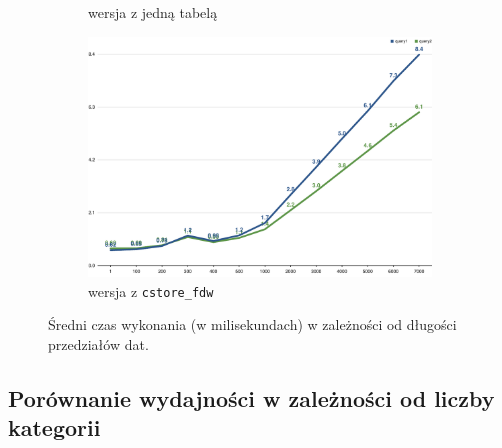 \documentclass[a4paper,11pt]{article}
\begin{document}
\begin{figure}[h!]
\begin{subfigure}{.49\textwidth}
        \caption{wersja z jedną tabelą}
    \end{subfigure}
    \begin{subfigure}{.5\textwidth}
        \centering
        \includegraphics[width=\textwidth]{charts/execution-time-cstore-fdw-distance_in_days}
        \caption{wersja z \texttt{cstore\_fdw}}
    \end{subfigure}
    \caption{Średni czas wykonania (w milisekundach) w zależności od długości przedziałów dat.}
    \label{execution-time-distance-in-days}
\end{figure}


\subsection{Porównanie wydajności w zależności od liczby kategorii}
\end{document}
